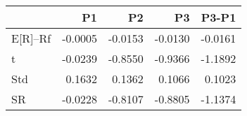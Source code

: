 \begin{tabular}{lrrrr}
\toprule
 & P1 & P2 & P3 & P3-P1 \\
\midrule
E[R]--Rf & -0.0005 & -0.0153 & -0.0130 & -0.0161 \\
t & -0.0239 & -0.8550 & -0.9366 & -1.1892 \\
Std & 0.1632 & 0.1362 & 0.1066 & 0.1023 \\
SR & -0.0228 & -0.8107 & -0.8805 & -1.1374 \\
\bottomrule
\end{tabular}
